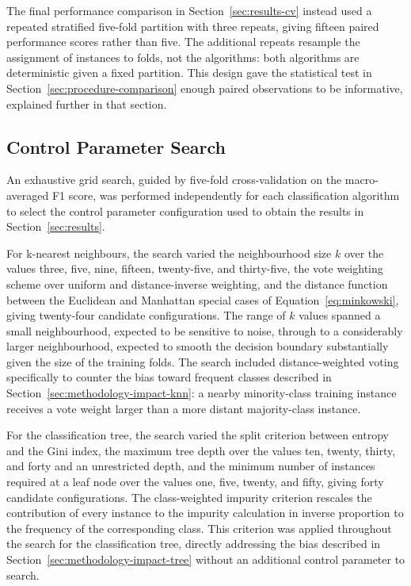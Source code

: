 \documentclass[10pt,conference]{IEEEtran}
\begin{document}
The final performance comparison in Section~\ref{sec:results-cv} instead used a repeated stratified five-fold partition with three repeats, giving fifteen paired performance scores rather than five. The additional repeats resample the assignment of instances to folds, not the algorithms: both algorithms are deterministic given a fixed partition. This design gave the statistical test in Section~\ref{sec:procedure-comparison} enough paired observations to be informative, explained further in that section.

\subsection{Control Parameter Search}
\label{sec:procedure-hyperparameters}

An exhaustive grid search, guided by five-fold cross-validation on the macro-averaged F1 score, was performed independently for each classification algorithm to select the control parameter configuration used to obtain the results in Section~\ref{sec:results}.

For k-nearest neighbours, the search varied the neighbourhood size $k$ over the values three, five, nine, fifteen, twenty-five, and thirty-five, the vote weighting scheme over uniform and distance-inverse weighting, and the distance function between the Euclidean and Manhattan special cases of Equation~\eqref{eq:minkowski}, giving twenty-four candidate configurations. The range of $k$ values spanned a small neighbourhood, expected to be sensitive to noise, through to a considerably larger neighbourhood, expected to smooth the decision boundary substantially given the size of the training folds. The search included distance-weighted voting specifically to counter the bias toward frequent classes described in Section~\ref{sec:methodology-impact-knn}: a nearby minority-class training instance receives a vote weight larger than a more distant majority-class instance.

For the classification tree, the search varied the split criterion between entropy and the Gini index, the maximum tree depth over the values ten, twenty, thirty, and forty and an unrestricted depth, and the minimum number of instances required at a leaf node over the values one, five, twenty, and fifty, giving forty candidate configurations. The class-weighted impurity criterion rescales the contribution of every instance to the impurity calculation in inverse proportion to the frequency of the corresponding class. This criterion was applied throughout the search for the classification tree, directly addressing the bias described in Section~\ref{sec:methodology-impact-tree} without an additional control parameter to search.
\end{document}
